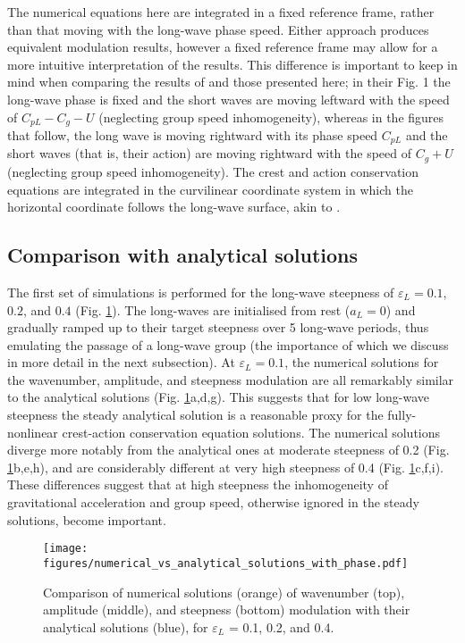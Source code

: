 \documentclass[lineno]{jfm}
\begin{document}
The numerical equations here are integrated in a fixed reference frame,
rather than that moving with the long-wave phase speed.
Either approach produces equivalent modulation results, however a fixed
reference frame may allow for a more intuitive interpretation of the results.
This difference is important to keep in mind when comparing the results
of \citet{peureux2021unsteady} and those presented here; in their Fig. 1 the
long-wave phase is fixed and the short waves are moving leftward
with the speed of $C_{pL} - C_g - U$ (neglecting group speed inhomogeneity),
whereas in the figures that follow, the long wave is moving rightward with its
phase speed $C_{pL}$ and the short waves (that is, their action) are moving
rightward with the speed of $C_g + U$ (neglecting group speed inhomogeneity).
The crest and action conservation equations are integrated in the curvilinear
coordinate system in which the horizontal coordinate follows the long-wave
surface, akin to \citet{zhang1990evolution}.

\subsection{Comparison with analytical solutions}
\label{subsection:comparison_with_analytical_solutions}

The first set of simulations is performed for the long-wave steepness of
$\varepsilon_L = 0.1$, $0.2$, and $0.4$ (Fig. \ref{fig:numerical_solutions}).
The long-waves are initialised from rest ($a_L = 0$) and gradually ramped up
to their target steepness over 5 long-wave periods, thus emulating the passage
of a long-wave group
(the importance of which we discuss in more detail in the next subsection).
At $\varepsilon_L = 0.1$, the numerical solutions for the wavenumber, amplitude,
and steepness modulation are all remarkably similar to the analytical solutions
(Fig. \ref{fig:numerical_solutions}a,d,g).
This suggests that for low long-wave steepness the steady analytical solution
is a reasonable proxy for the fully-nonlinear crest-action conservation
equation solutions.
The numerical solutions diverge more notably from the analytical ones at
moderate steepness of 0.2 (Fig. \ref{fig:numerical_solutions}b,e,h), and are
considerably different at very high steepness of 0.4
(Fig. \ref{fig:numerical_solutions}c,f,i).
These differences suggest that at high steepness the inhomogeneity of
gravitational acceleration and group speed, otherwise ignored in the steady
solutions, become important.

\begin{figure}
\centering
\texttt{[image: figures/numerical\_vs\_analytical\_solutions\_with\_phase.pdf]}
\caption{
  Comparison of numerical solutions (orange) of wavenumber (top), amplitude
  (middle), and steepness (bottom) modulation with their analytical solutions
  (blue), for $\varepsilon_L$ = 0.1, 0.2, and 0.4.
}
\label{fig:numerical_solutions}
\end{figure}
\end{document}
